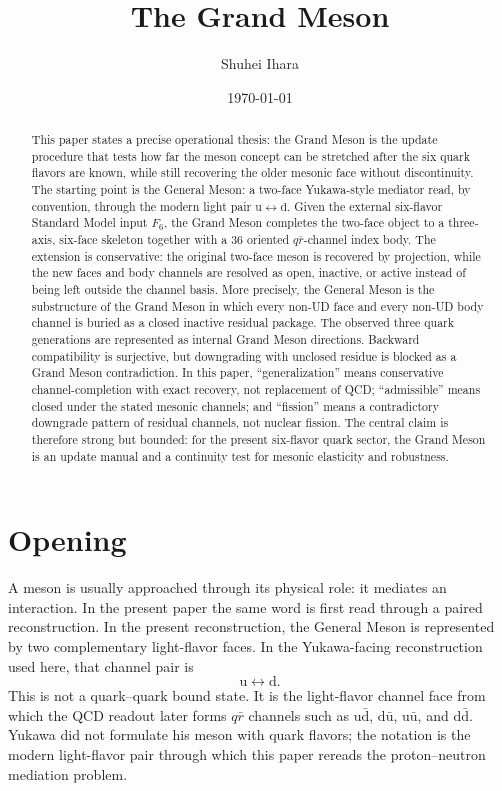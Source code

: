 \documentclass[11pt]{article}
\title{The Grand Meson}
\author{Shuhei Ihara}
\date{\today}
\theoremstyle{definition}
\theoremstyle{plain}
\newcommand{\qu}{\mathrm u}
\newcommand{\qd}{\mathrm d}
\begin{document}
\maketitle

\begin{abstract}
This paper states a precise operational thesis: the Grand Meson is the
update procedure that tests how far the meson concept can be stretched after
the six quark flavors are known, while still recovering the older mesonic
face without discontinuity.  The starting point is the General Meson: a
two-face Yukawa-style mediator read, by convention, through the modern
light pair \(\qu\leftrightarrow\qd\).  Given the external six-flavor
Standard Model input \(F_6\), the Grand Meson completes the two-face object
to a three-axis, six-face skeleton together with a \(36\) oriented
\(q\bar r\)-channel index body.  The extension is
conservative: the
original two-face meson is recovered by projection, while the new faces and
body channels are resolved as open, inactive, or active instead of being
left outside the channel basis.  More precisely, the General Meson is the
substructure of the Grand Meson in which every non-UD face and every non-UD
body channel is buried as a closed inactive residual package.  The observed
three quark generations are represented as internal Grand Meson directions.
Backward compatibility is surjective, but downgrading with unclosed residue
is blocked as a Grand Meson contradiction.  In this paper,
``generalization'' means conservative channel-completion with exact
recovery, not replacement of QCD; ``admissible'' means closed under the
stated mesonic channels; and ``fission'' means a contradictory downgrade
pattern of residual channels, not nuclear fission.  The central claim is
therefore strong but bounded: for the present six-flavor quark sector, the
Grand Meson is an update manual and a continuity test for mesonic elasticity
and robustness.
\end{abstract}

\section{Opening}

A meson is usually approached through its physical role: it mediates an
interaction.  In the present paper the same word is first read through a
paired reconstruction.  In the present reconstruction, the General Meson is
represented by two complementary light-flavor faces.
In the Yukawa-facing reconstruction used here, that channel pair is
\[
  \qu\leftrightarrow\qd.
\]
This is not a quark--quark bound state.  It is the light-flavor channel face
from which the QCD readout later forms \(q\bar r\) channels such as
\(\qu\bar{\qd}\), \(\qd\bar{\qu}\), \(\qu\bar{\qu}\), and
\(\qd\bar{\qd}\).  Yukawa did not formulate his meson with quark flavors;
the notation is the modern light-flavor pair through which this paper
rereads the proton--neutron mediation problem.
\end{document}
